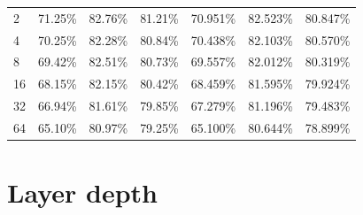 \begin{table}[H]
\begin{tabular}{lllllll}
2          & 71.25\%     & 82.76\%                                                                       & \multicolumn{1}{l|}{81.21\%}                                                                       & 70.951\%    & 82.523\%                                                                   & 80.847\%                                                                \\
4          & 70.25\%     & 82.28\%                                                                       & \multicolumn{1}{l|}{80.84\%}                                                                       & 70.438\%    & 82.103\%                                                                   & 80.570\%                                                                \\
8          & 69.42\%     & 82.51\%                                                                       & \multicolumn{1}{l|}{80.73\%}                                                                       & 69.557\%    & 82.012\%                                                                   & 80.319\%                                                                \\
16         & 68.15\%     & 82.15\%                                                                       & \multicolumn{1}{l|}{80.42\%}                                                                       & 68.459\%    & 81.595\%                                                                   & 79.924\%                                                                \\
32         & 66.94\%     & 81.61\%                                                                       & \multicolumn{1}{l|}{79.85\%}                                                                       & 67.279\%    & 81.196\%                                                                   & 79.483\%                                                                \\
64         & 65.10\%     & 80.97\%                                                                       & \multicolumn{1}{l|}{79.25\%}                                                                       & 65.100\%    & 80.644\%                                                                   & 78.899\%                                                               
\end{tabular}
\end{table}

\section*{Layer depth}

